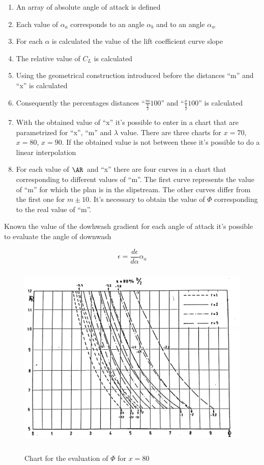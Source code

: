 \begin{enumerate}
	\item An array of absolute angle of attack is defined
	\item Each value of $\alpha_a$ corresponds to an angle $\alpha_b$ and to an angle $\alpha_w$
	\item For each $\alpha$ is calculated the value of the lift coefficient curve slope
	\item The relative value of $C_L$ is calculated
	\item Using the geometrical construction introduced before the distances ``m'' and ``x'' is calculated
	\item Consequently the percentages distances ``$\frac{m}{\frac{b}{2}} 100$'' and ``$\frac{x}{\frac{b}{2}} 100$'' is calculated
	\item With the obtained value of ``x'' it's possible to enter in a chart that are parametrized for ``x'', ``m'' and $\lambda$ value. There are three charts for $x=70$, $x=80$, $x=90$. If the obtained value is not between these it's possible to do a linear interpolation
	\item For each value of $\AR$\ and ``x'' there are four curves in a chart that corresponding to different values of ``m''. The first curve represents the value of ``m'' for which the plan is in the slipstream. The other curves differ from the first one for $m \pm 10$. It's necessary to obtain the value of $\Phi$ corresponding to the real value of  ``m''.
\end{enumerate}

Known the value of the dowhwash gradient for each angle of attack it's possible to evaluate the angle of downwash

\begin{equation}
\epsilon = \frac{d\epsilon}{d\alpha} \alpha_a
\end{equation}
\begin{figure}[H]
\centering
{\includegraphics[height=9cm]{immagini/chartGiordano}} 
\caption{Chart for the evaluation of $\Phi$ for $x=80$}
\label{giordanodata}
\end{figure} 

